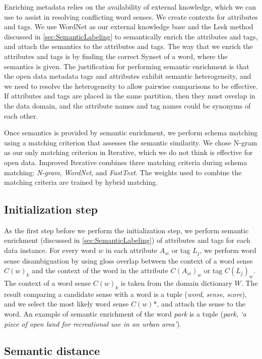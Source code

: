 Enriching metadata relies on the availability of external knowledge, which we can use to assist in resolving conflicting word senses. We create contexts for attributes and tags. We use WordNet as our external knowledge base and the Lesk method discussed in \autoref{sec:SemanticLabeling} to semantically enrich the attributes and tags, and attach the semantics to the attributes and tags. The way that we enrich the attributes and tags is by finding the correct Synset of a word, where the semantics is given. The justification for performing semantic enrichment is that the open data metadata tags and attributes exhibit semantic heterogeneity, and we need to resolve the heterogeneity to allow pairwise comparisons to be effective. If attributes and tags are placed in the same partition, then they must overlap in the data domain, and the attribute names and tag names could be synonyms of each other.

Once semantics is provided by semantic enrichment, we perform schema matching using a matching criterion that assesses the semantic similarity. We chose N-gram as our only matching criterion in Iterative, which we do not think is effective for open data. Improved Iterative combines three matching criteria during schema matching: \textit{N-gram}, \textit{WordNet}, and \textit{FastText}. The weights used to combine the matching criteria are trained by hybrid matching.

\subsection{Initialization step}

As the first step before we perform the initialization step, we perform semantic enrichment (discussed in \autoref{sec:SemanticLabeling}) of attributes and tags for each data instance. For every word $w$ in each attribute $A_{si}$ or tag $L_j$, we perform word sense disambiguation by using gloss overlap between the context of a word sense $C(w)_k$ and the context of the word in the attribute $C(A_{si})_w$ or tag $C(L_j)_w$. The context of a word sense $C(w)_k$ is taken from the domain dictionary $W$. The result comparing a candidate sense with a word is a tuple (\textit{word}, \textit{sense}, \textit{score}), and we select the most likely word sense $C(w)$*, and attach the sense to the word. An example of semantic enrichment of the word \textit{park} is a tuple (\textit{park}, \textit{`a piece of open land for recreational use in an urban area'}).

\subsection{Semantic distance}

